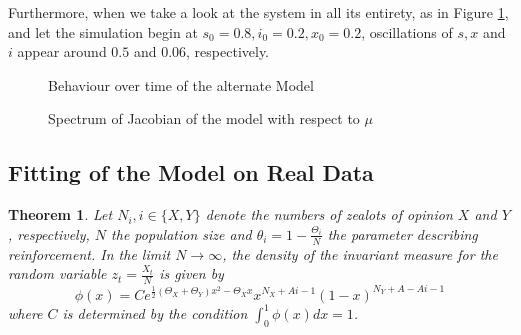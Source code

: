 \documentclass[12pt,a4paper,twoside]{article}
\newtheorem{thm}{Theorem}[section]
\begin{document}
\newpage

Furthermore, when we take a look at the system in all its entirety, as in Figure \ref{fig:time_behaviour_my_model}, and let the simulation begin at $s_0 = 0.8, i_0 = 0.2, x_0 = 0.2$, oscillations of $s, x$ and $i$ appear around $0.5$ and $0.06$, respectively.

\begin{figure}[h!]
	\centering
	\caption{Behaviour over time of the alternate Model}
	\label{fig:time_behaviour_my_model}
	\def\svgwidth{350pt}
	
\end{figure}

\begin{figure}[h!]
	\centering
	\caption{Spectrum of Jacobian of the model with respect to $\mu$}
	\label{fig:eigenvalue_diagram_hopf}
	\def\svgwidth{350pt}
	
\end{figure}


\newpage

\subsection{Fitting of the Model on Real Data}


\begin{thm}\label{theorem:weak_eff_lim}
	Let $N_i, i \in \lbrace X,Y\rbrace$ denote the numbers of zealots of opinion $X$ and $Y$, respectively, $N$ the population size and $\theta_i = 1-\frac{\Theta_i}{N}$ the parameter describing reinforcement. In the limit $N \rightarrow \infty$, the density of the invariant measure for the random variable $z_t = \frac{X_t}{N}$ is given by
	\begin{equation}
	\phi(x) = Ce^{\frac{1}{2}\left(\Theta_X + \Theta_Y\right)x^2 - \Theta_X x}x^{N_X + Ai - 1}\left(1-x\right)^{N_Y+A - Ai - 1}
	\end{equation}
	where $C$ is determined by the condition $\int_{0}^{1}\phi(x) dx = 1$.
\end{thm}
\end{document}
